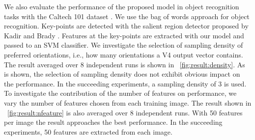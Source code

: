 \documentclass{ecai2014}
\begin{document}
We also evaluate the performance of the proposed model in object recognition tasks
with the Caltech 101 dataset \cite{Fei-Fei2004}.
We use the bag of words approach for object recognition.
Key-points are detected with the salient region detector proposed by Kadir and Brady \cite{Kadir2001}.
Features at the key-points are extracted with our model and passed to an SVM classifier.
We investigate the selection of sampling density of preferred orientations,
i.e., how many orientations a V4 output vector contains.
The result averaged over 8 independent runs is shown in \figurename~\ref{fig:result:density}.
As is shown, the selection of sampling density does not exhibit obvious impact on the performance.
In the succeeding experiments, a sampling density of $3$ is used. 
To investigate the contribution of the number of features on performance,
we vary the number of features chosen from each training image.
The result shown in \figurename~\ref{fig:result:nfeature} is also averaged over 8 independent runs.
With 50 features per image the result approaches the best performance.
In the succeeding experiments, 50 features are extracted from each image.
\end{document}
